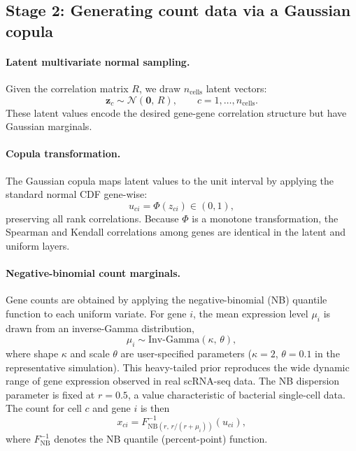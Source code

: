 \subsection*{Stage 2: Generating count data via a Gaussian copula}

\paragraph{Latent multivariate normal sampling.}
Given the correlation matrix $R$, we draw $n_\mathrm{cells}$ latent vectors:
\begin{equation}
  \mathbf{z}_c \sim \mathcal{N}(\mathbf{0},\,R), \qquad c = 1,\ldots,n_\mathrm{cells}.
\end{equation}
These latent values encode the desired gene-gene correlation structure but have
Gaussian marginals.

\paragraph{Copula transformation.}
The Gaussian copula maps latent values to the unit interval by applying the
standard normal CDF gene-wise:
\begin{equation}
  u_{ci} = \Phi(z_{ci}) \in (0,1),
\end{equation}
preserving all rank correlations.
Because $\Phi$ is a monotone transformation, the Spearman and Kendall correlations
among genes are identical in the latent and uniform layers.

\paragraph{Negative-binomial count marginals.}
Gene counts are obtained by applying the negative-binomial (NB) quantile function to
each uniform variate.
For gene $i$, the mean expression level $\mu_i$ is drawn from an inverse-Gamma
distribution,
\begin{equation}
  \mu_i \sim \mathrm{Inv\text{-}Gamma}(\kappa,\,\theta),
\end{equation}
where shape $\kappa$ and scale $\theta$ are user-specified parameters
($\kappa = 2$, $\theta = 0.1$ in the representative simulation).
This heavy-tailed prior reproduces the wide dynamic range of gene expression observed
in real scRNA-seq data.
The NB dispersion parameter is fixed at $r = 0.5$, a value characteristic of
bacterial single-cell data.
The count for cell $c$ and gene $i$ is then
\begin{equation}
  x_{ci} = F^{-1}_{\mathrm{NB}(r,\, r/(r+\mu_i))}(u_{ci}),
\end{equation}
where $F^{-1}_{\mathrm{NB}}$ denotes the NB quantile (percent-point) function.

